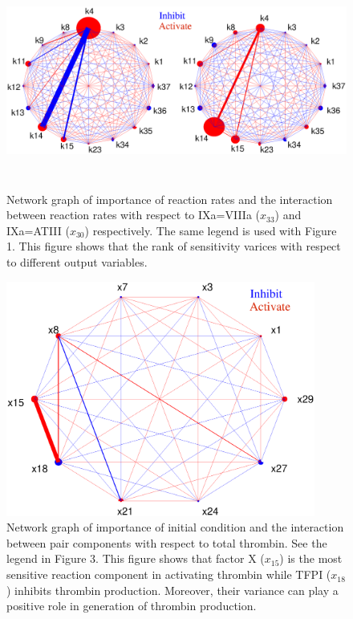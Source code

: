 \begin{figure}
  \begin{center}

\includegraphics[width=5in,height=2.5in]{figures/nsarb33.eps}
\caption{Network graph of importance of reaction rates and the
interaction between reaction rates with respect to IXa=VIIIa
($x_{33}$) and IXa=ATIII ($x_{30}$) respectively. The same legend is
used with Figure 1. This figure shows that the rank of sensitivity
varices with respect to different output variables. }
\label{fig:NSA}


  \includegraphics[width=4in]{figures/nsaic.eps}
\caption{Network graph of importance of initial condition and the
interaction between pair components with respect to total thrombin.
See the legend in Figure 3. This figure shows that factor X
($x_{15}$) is the most sensitive reaction component in activating
thrombin while TFPI ($x_{18}$) inhibits thrombin production.
Moreover, their variance can play a positive role in generation of
thrombin production.} \label{Fig:nsaic}


  \end{center}
\end{figure}


